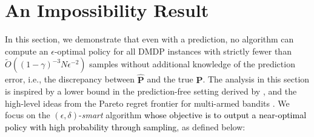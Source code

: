 \documentclass[12pt]{article}
\begin{document}

\section{An Impossibility Result}
\label{sec:impossibility-result}

In this section, we demonstrate that even with a prediction, no algorithm can compute an $\epsilon$-optimal policy for all DMDP instances with strictly fewer than $\tilde{O}((1-\gamma)^{-3} N \epsilon^{-2})$ samples without additional knowledge of the prediction error, i.e., the discrepancy between $\hat{\boldsymbol{\text{P}}}$ and the true $\boldsymbol{\text{P}}$. The analysis in this section is inspired by a lower bound in the prediction-free setting derived by \cite{gheshlaghi2013minimax}, and the high-level ideas from the Pareto regret frontier for multi-armed bandits \cite{lattimore2015pareto}. We focus on the $(\epsilon,\delta)$-\textit{smart} algorithm \textcolor{black}{whose objective is to output a near-optimal policy with high probability through sampling}, as defined below:
\end{document}
